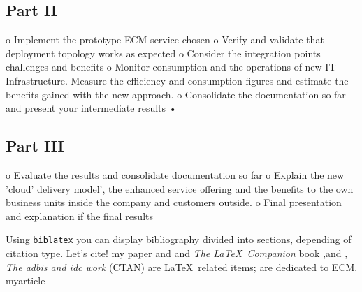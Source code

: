 \documentclass{article}
\begin{document}
\subsection{Part II}
o	Implement the prototype ECM service chosen
o	Verify and validate that deployment topology works as expected
o	Consider the integration points challenges and benefits
o	Monitor consumption and the operations of new IT-Infrastructure. 
Measure the efficiency and consumption figures and estimate the benefits 
gained with the new approach. 
o	Consolidate the documentation so far and present your intermediate results
•\subsection{Part III}
o	Evaluate the results and consolidate documentation so far  
o	Explain the new 'cloud' delivery model', the enhanced service offering and the benefits 
to the own business units inside the company and customers outside.  
o	Final presentation and explanation if the final results


Using \texttt{biblatex} you can display bibliography divided into sections, depending of citation type. 
Let's cite! my paper 
  \cite{DBLP:conf/gi/MegaL14} and 
  \cite{DBLP:conf/btw/WaizeneggerSM13} and 
  \textit{The \LaTeX\ Companion} book 
  \cite{DBLP:conf/iesa/RitterMM12},and
  \cite{DBLP:conf/adbis/WagnerKMMR08}, 
  \textit{The adbis and idc work} (CTAN) 
  \cite{DBLP:conf/idc/WagnerKMMR08} are \LaTeX\ related items;  
  \cite{DBLP:conf/btw/MegaWM05} are dedicated to ECM. 
  \cite{DBLP:journals/ibmrd/MegaWLSB14}myarticle

\medskip

\printbibliography[
heading=bibintoc,
title={myWhole bibliography}
] %

\clearpage

\printbibliography[heading=subbibintoc,type=article,title={Articles only}]
\printbibliography[type=book,title={Books only}]
\printbibliography[keyword={physics},title={Physics-related only}]
\printbibliography[keyword={latex},title={\LaTeX-related only}]
\end{document}
